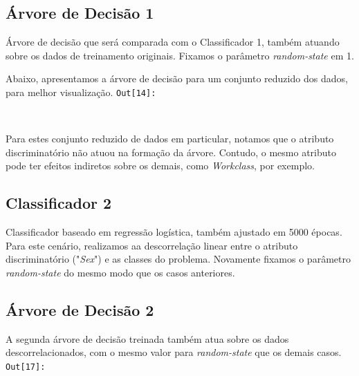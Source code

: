 \documentclass[11pt]{article}
\begin{document}
    \subsection{Árvore de Decisão 1}\label{uxe1rvore-de-decisuxe3o-1}

Árvore de decisão que será comparada com o Classificador 1, também
atuando sobre os dados de treinamento originais. Fixamos o parâmetro
\emph{random-state} em 1.

    Abaixo, apresentamos a árvore de decisão para um conjunto reduzido dos
dados, para melhor visualização.
\texttt{\color{outcolor}Out[{\color{outcolor}14}]:}
    
    \begin{center}
    \end{center}
    { \hspace*{\fill} \\}
    

    Para estes conjunto reduzido de dados em particular, notamos que o
atributo discriminatório não atuou na formação da árvore. Contudo, o
mesmo atributo pode ter efeitos indiretos sobre os demais, como
\emph{Workclass}, por exemplo.

    \subsection{Classificador 2}\label{classificador-2}

Classificador baseado em regressão logística, também ajustado em 5000
épocas. Para este cenário, realizamos aa descorrelação linear entre o
atributo discriminatório ("\emph{Sex}") e as classes do problema.
Novamente fixamos o parâmetro \emph{random-state} do mesmo modo que os
casos anteriores.

    \subsection{Árvore de Decisão 2}\label{uxe1rvore-de-decisuxe3o-2}

A segunda árvore de decisão treinada também atua sobre os dados
descorrelacionados, com o mesmo valor para \emph{random-state} que os
demais casos.
\texttt{\color{outcolor}Out[{\color{outcolor}17}]:}
    
    \begin{center}
    \end{center}
    { \hspace*{\fill} \\}
    
\end{document}
